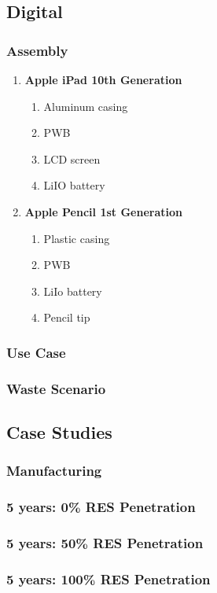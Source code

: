\subsection{Digital}\label{subsec:digital_scenario}

\subsubsection*{Assembly}
\begin{enumerate}
    \item \textbf{Apple iPad 10th Generation}
    \begin{enumerate}
        \item Aluminum casing
        \item PWB
        \item LCD screen
        \item LiIO battery
    \end{enumerate}
    \item \textbf{Apple Pencil 1st Generation}
    \begin{enumerate}
        \item Plastic casing
        \item PWB
        \item LiIo battery
        \item Pencil tip
    \end{enumerate}
\end{enumerate}

\subsubsection*{Use Case}

\subsubsection*{Waste Scenario}

\subsection{Case Studies}\label{subsec:case_studies}

\subsubsection*{Manufacturing}

\subsubsection*{5 years: 0\% RES Penetration}

\subsubsection*{5 years: 50\% RES Penetration}

\subsubsection*{5 years: 100\% RES Penetration}
